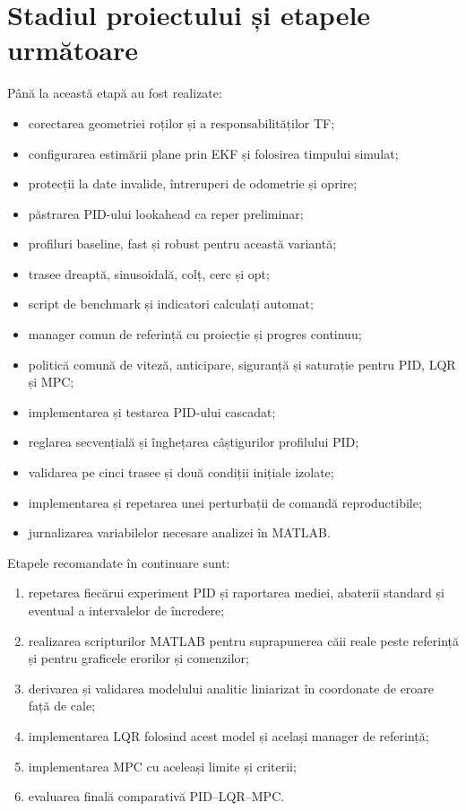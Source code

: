 \documentclass[12pt,a4paper,oneside]{report}
\begin{document}
\chapter{Stadiul proiectului și etapele următoare}

Până la această etapă au fost realizate:

\begin{itemize}
  \item corectarea geometriei roților și a responsabilităților TF;
  \item configurarea estimării plane prin EKF și folosirea timpului simulat;
  \item protecții la date invalide, întreruperi de odometrie și oprire;
  \item păstrarea PID-ului lookahead ca reper preliminar;
  \item profiluri baseline, fast și robust pentru această variantă;
  \item trasee dreaptă, sinusoidală, colț, cerc și opt;
  \item script de benchmark și indicatori calculați automat;
  \item manager comun de referință cu proiecție și progres continuu;
  \item politică comună de viteză, anticipare, siguranță și saturație pentru
        PID, LQR și MPC;
  \item implementarea și testarea PID-ului cascadat;
  \item reglarea secvențială și înghețarea câștigurilor profilului PID;
  \item validarea pe cinci trasee și două condiții inițiale izolate;
  \item implementarea și repetarea unei perturbații de comandă reproductibile;
  \item jurnalizarea variabilelor necesare analizei în MATLAB.
\end{itemize}

Etapele recomandate în continuare sunt:

\begin{enumerate}
  \item repetarea fiecărui experiment PID și raportarea mediei, abaterii standard și
        eventual a intervalelor de încredere;
  \item realizarea scripturilor MATLAB pentru suprapunerea căii reale peste
        referință și pentru graficele erorilor și comenzilor;
  \item derivarea și validarea modelului analitic liniarizat în coordonate de
        eroare față de cale;
  \item implementarea LQR folosind acest model și același manager de referință;
  \item implementarea MPC cu aceleași limite și criterii;
  \item evaluarea finală comparativă PID--LQR--MPC.
\end{enumerate}
\end{document}
